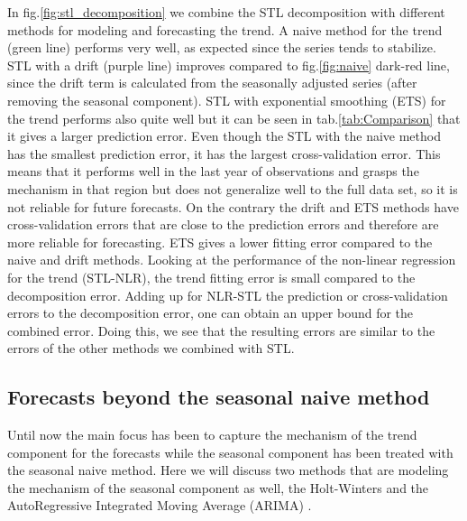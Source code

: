 \documentclass[12pt, letterpaper]{article}\usepackage[]{graphicx}\usepackage[]{color}
\begin{document}
In fig.\ref{fig:stl_decomposition} we combine the STL decomposition with different methods for modeling and forecasting the trend. A naive method for the trend (green line) performs very well, as expected since the series tends to stabilize. STL with a drift (purple line) improves compared to fig.\ref{fig:naive} dark-red line, since the drift term is calculated from the seasonally adjusted series (after removing the seasonal component). STL with exponential smoothing (ETS)\cite{Hyndman_book} for the trend performs also quite well but it can be seen in tab.\ref{tab:Comparison} that it gives a larger prediction error. Even though the STL with the naive method has the smallest prediction error, it has the largest cross-validation error. This means that it performs well in the last year of observations and grasps the mechanism in that region but does not generalize well to the full data set, so it is not reliable for future forecasts. On the contrary the drift and ETS methods have cross-validation errors that are close to the prediction errors  and therefore are more reliable for forecasting. ETS gives a lower fitting error compared to the naive and drift methods. Looking at the performance of the non-linear regression for the trend (STL-NLR), the trend fitting error is small compared to the decomposition error. Adding up for NLR-STL the prediction or cross-validation errors to the decomposition error, one can obtain an upper bound for the combined error. Doing this, we see that the resulting errors are similar to the errors of the other methods we combined with STL. 

\subsection{Forecasts beyond the seasonal naive method}

Until now the main focus has been to capture the mechanism of the trend component for the forecasts while the seasonal component has been treated with the seasonal naive method. Here we will discuss two methods that are modeling the mechanism of the seasonal component as well, the Holt-Winters \cite{Winters,Holt} and the AutoRegressive Integrated Moving Average (ARIMA) \cite{ARIMA}.
\end{document}

